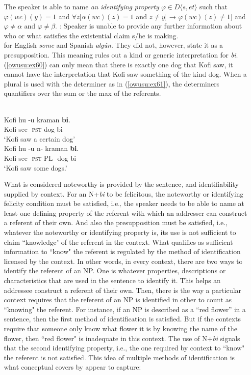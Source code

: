 \documentclass[output=paper,modfonts,nonflat,draftmode]{langsci/langscibook}
\begin{document}
\ex \label{51} The speaker is able to name \textit{an identifying property} $\varphi \in D \langle s,et\rangle$ such that $\varphi(wc)(y)=1$ and $\forall z[\alpha(wc)(z)=1$ and $z\neq y]$ → $\varphi(wc)(z)\neq 1]$ and $\varphi \neq \alpha$ and $\varphi \neq \beta$.
: Speaker is unable to provide any further information about who or what satisfies the existential claim s/he is making.\\ \citet{Benito2003} for English \emph{some} and Spanish \emph{alg\'un}. They did not, however, state it as a presupposition.  
\z \z This meaning rules out a kind or generic interpretation for \emph{bi}. (\ref{owusu:ex60}) can only mean that there is exactly one dog that Kofi saw, it cannot have the interpretation that Kofi saw something of the kind dog. When a plural is used with the determiner as in (\ref{owusu:ex61}), the determiners quantifiers over the sum or the max of the referents.

\ea {}\\
\ea\label{owusu:ex60}
\gll Kofi hu -u kraman \textbf{bi}.\\
Kofi see -\textsc{pst} dog bi\\
\glt `Kofi saw a certain dog'\\
	
\ex \label{owusu:ex61}
\gll Kofi hu -u n-  kraman \textbf{bi}.\\
     Kofi see -\textsc{pst} PL- dog bi\\
\glt     `Kofi saw some dogs.' 

 \z\z What is considered noteworthy is provided by the sentence, and identifiability supplied by context. 
For an N+\textit{bi} to be felicitous, the noteworthy or identifying felicity condition must be satisfied, i.e., the speaker needs to be able to name at least one defining property of the referent with which an addresser can construct a referent of their own. And also the presupposition must be satisfied, i.e., whatever the noteworthy or identifying property is, its use is not sufficient to claim ``knowledge" of the referent in the context. What qualifies as sufficient information to ``know" the referent is regulated by the method of identification licensed by the context. In other words, in every context, there are two ways to identify the referent of an NP. One is whatever properties, descriptions or characteristics that are used in the sentence to identify it. This helps an addressee construct a referent of their own. Then, there is the way a particular context requires that the referent of an NP is identified in other to count as ``knowing" the referent. For instance, if an NP is described as a ``red flower'' in a sentence, then the first method of identification is satisfied. But if the contexts require that someone only know what flower it is by knowing the name of the flower, then ``red flower" is inadequate in this context. The use of N+\textit{bi} signals that the second identifying property, i.e., the one required by context to ``know" the referent is not satisfied. This idea of multiple methods of identification is what conceptual covers by \citet{AloniPort2015} appear to capture:
\end{document}
